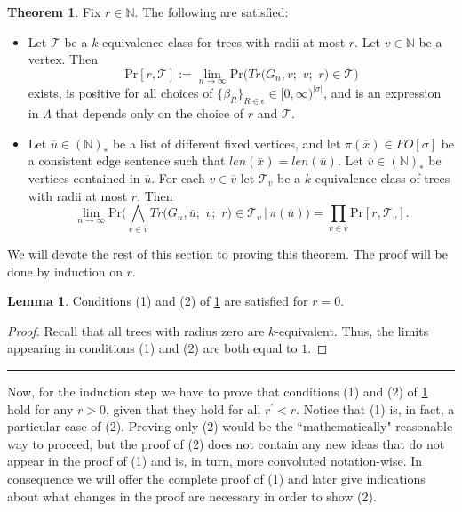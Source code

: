 \documentclass[12pt,notitlepage,a4paper]{article}
\theoremstyle{definition}
\newtheorem{theorem}{Theorem}[section]
\newtheorem{lemma}{Lemma}[section]
\newcommand{\N}{\mathbb{N}}
\newcommand{\Ln}{\lim\limits_{n\to \infty}}
\newcommand{\PR}[1]{\mathrm{Pr}\big(#1\big)}
\newcommand{\sep}{\noindent\rule{2cm}{0.4pt}}
\begin{document}
\begin{theorem} \label{thm:BigTrees}
	Fix $r\in \N$. The following are satisfied:
	\begin{itemize}
		\item[(1)] Let $\mathcal{T}$ be a
		$k$-equivalence class for trees with radii at most $r$. Let
		$v\in \N$ be a vertex.	Then 
		\[
		\mathrm{Pr}[r,\mathcal{T}]:=\Ln  \PR{Tr\big(G_n,v;\,\,v;\,\,r\big)\in \mathcal{T}}
		\]
		exists,
		is positive for all choices of 
		$\{\beta_R\}_{R\in \epsilon}\in [0,\infty)^{|\sigma|}$,
		and is an expression
		in $\Lambda$ that depends only on the choice of $r$ and $\mathcal{T}$.
		\item[(2)] Let $\overline{u}\in (\N)_*$ be a list of different fixed 
		vertices, and let $\pi(\overline{x})\in FO[\sigma]$ be a consistent
		edge sentence such that 
		$len(\overline{x})=len(\overline{u})$.
		Let $\overline{v}\in (\N)_*$ be vertices contained
		in $\overline{u}$. For each $v\in \overline{v}$
		let $\mathcal{T}_v$ be a $k$-equivalence class
		of trees with radii	at most $r$. Then
		\[
		\Ln \mathrm{Pr}\big( \bigwedge_{v\in \overline{v}} 
		Tr\big(G_n, \overline{u};\,\,v;\,\,r\big)\in \mathcal{T}_v 
		\, | \, \pi(\overline{u})
		\big)= \prod_{v\in \overline{v}} \mathrm{Pr}[r,\mathcal{T}_v]. \]	 	
	\end{itemize}
\end{theorem}
	We will devote the rest of this section to proving this
	theorem. The proof will be done by induction on $r$. 
	
\begin{lemma}
	Conditions (1) and (2) of \cref{thm:BigTrees} 
	are satisfied for $r=0$.
\end{lemma}
\begin{proof}
	Recall that	all trees with radius zero are $k$-equivalent. Thus,
	the limits
	appearing in conditions (1) and (2) are both equal to $1$.
\end{proof}
\sep

Now, for the induction step we have to prove that 
conditions (1) and (2) of \cref{thm:BigTrees} hold
for any $r>0$, given that they hold for all
$r^\prime < r$. Notice that (1) is, in fact, a particular
case of (2). Proving only (2) would be the ``mathematically"
reasonable way to proceed, but the proof of (2) does not contain
any new ideas that do not appear in the proof of (1) and is, in turn,
more convoluted notation-wise. In consequence we will offer the complete 
proof of (1) and later give indications about what changes in the proof
are necessary in order to show (2). 
	
\end{document}

